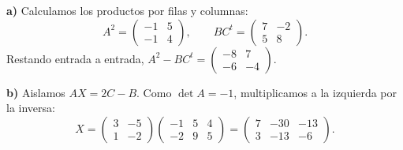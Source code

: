 \textbf{a)} Calculamos los productos por filas y columnas:
\[
A^2=\begin{pmatrix}-1&5\\-1&4\end{pmatrix},
\qquad BC^t=\begin{pmatrix}7&-2\\5&8\end{pmatrix}.
\]
Restando entrada a entrada, $A^2-BC^t=\boxed{\begin{pmatrix}-8&7\\-6&-4\end{pmatrix}}$.

\textbf{b)} Aislamos $AX=2C-B$. Como $\det A=-1$, multiplicamos a la izquierda por la inversa:
\[
X=\begin{pmatrix}3&-5\\1&-2\end{pmatrix}
\begin{pmatrix}-1&5&4\\-2&9&5\end{pmatrix}
=\boxed{\begin{pmatrix}7&-30&-13\\3&-13&-6\end{pmatrix}}.
\]
